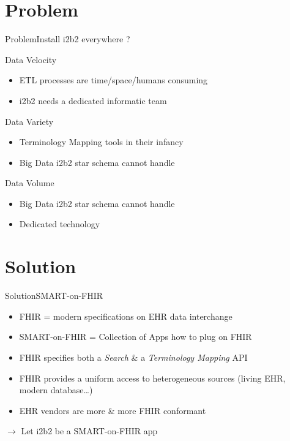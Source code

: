 \documentclass[10pt]{beamer}
\begin{document}
\section{Problem}
\begin{frame}{Problem}{Install i2b2 everywhere ?}

\begin{block}{Data Velocity}
\begin{itemize}
	\item[] ETL processes are time/space/humans consuming
	\item[] i2b2 needs a dedicated informatic team
\end{itemize}
\end{block}

\begin{block}{Data Variety}
\begin{itemize}
	\item[] Terminology Mapping tools in their infancy
	\item[] Big Data i2b2 star schema cannot handle
\end{itemize}
\end{block}

\begin{block}{Data Volume}
\begin{itemize}
	\item[] Big Data i2b2 star schema cannot handle
	\item[] Dedicated technology

\end{itemize}
\end{block}

\end{frame}

\section{Solution}
\begin{frame}{Solution}{SMART-on-FHIR}

\begin{itemize}
\item FHIR = modern specifications on EHR data interchange
\item SMART-on-FHIR = Collection of Apps how to plug on FHIR
\item FHIR specifies both a \emph{Search} \& a \emph{Terminology Mapping} API
\item FHIR provides a uniform access to heterogeneous sources (living EHR, modern database\ldots)
\item EHR vendors are more \& more FHIR conformant
\end{itemize}
$\rightarrow$ Let i2b2 be a SMART-on-FHIR app
\end{frame}
\end{document}
